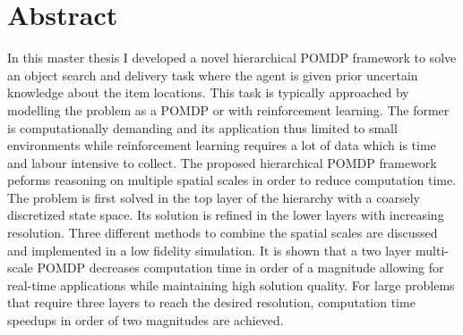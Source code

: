 \chapter*{Abstract}




In this master thesis I developed a novel hierarchical POMDP framework to solve an object search and delivery task where the agent is given prior uncertain knowledge about the item locations. 
This task is typically approached by modelling the problem as a POMDP or with reinforcement learning. The former is computationally demanding and its application thus limited to small environments while reinforcement learning requires a lot of data which is time and labour intensive to collect. The proposed hierarchical POMDP framework peforms reasoning on multiple spatial scales in order to reduce computation time. 
The problem is first solved in the top layer of the hierarchy with a coarsely discretized state space. Its solution is refined in the lower layers with increasing resolution. Three different methods to combine the spatial scales are discussed and implemented in a low fidelity simulation. It is shown that a two layer multi-scale POMDP decreases computation time in order of a magnitude allowing for real-time applications while maintaining high solution quality. For large problems that require three layers to reach the desired resolution, computation time speedups in order of two magnitudes are achieved.
